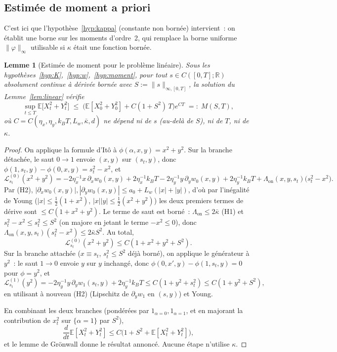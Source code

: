 \documentclass[11pt,a4paper]{article}
\newcommand{\ind}[1]{\mathrm{1}_{#1}}
\newcommand{\E}{\mathbb{E}}
\newcommand{\R}{\mathbb{R}}
\newcommand{\Lon}{\Lambda_{\mathrm{on}}}
\theoremstyle{plain}
\newtheorem{lem}[thm]{Lemme}
\theoremstyle{definition}
\begin{document}
\subsection{Estim\'ee de moment a priori}
\label{sec:moment}

C'est ici que l'hypoth\`ese~\ref{hyp:kappa} (constante non born\'ee) intervient~: on \'etablit une borne sur les moments d'ordre~2, qui remplace la borne uniforme $\|\varphi\|_\infty$ utilisable si $\kappa$ \'etait une fonction born\'ee.

\begin{lem}[Estim\'ee de moment pour le probl\`eme lin\'eaire]
\label{lem:moment}
Sous les hypoth\`eses~\ref{hyp:K},~\ref{hyp:w},~\ref{hyp:moment}, pour tout $s\in C([0,T];\R)$ absolument continue \`a d\'eriv\'ee born\'ee avec $S:=\|s\|_{\infty,[0,T]}$, la solution du Lemme~\ref{lem:linear} v\'erifie
\[
\sup_{t\le T}\E\big[X_t^2+Y_t^2\big] \;\le\; \big(\E[X_0^2+Y_0^2] + C(1+S^2)\,T\big)e^{CT} \;=:\; M(S,T),
\]
o\`u $C=C(\eta_x,\eta_y,k_BT,L_w,\bar\kappa,d)$ ne d\'epend ni de $s$ (au-del\`a de $S$), ni de $T$, ni de $\kappa$.
\end{lem}

\begin{proof}
On applique la formule d'It\^o \`a $\phi(\alpha,x,y)=x^2+y^2$. Sur la branche d\'etach\'ee, le saut $0\to1$ envoie $(x,y)$ sur $(s_t,y)$, donc $\phi(1,s_t,y)-\phi(0,x,y)=s_t^2-x^2$, et
\[
\mathcal L^{(0)}_{s_t}(x^2+y^2) = -2\eta_x^{-1}x\,\partial_xw_0(x,y)+2\eta_x^{-1}k_BT -2\eta_y^{-1}y\,\partial_yw_0(x,y)+2\eta_y^{-1}k_BT + \Lon(x,y,s_t)\big(s_t^2-x^2\big).
\]
Par (H2), $|\partial_xw_0(x,y)|,|\partial_yw_0(x,y)|\le a_0+L_w(|x|+|y|)$, d'o\`u par l'in\'egalit\'e de Young ($|x|\le\frac12(1+x^2)$, $|x||y|\le\frac12(x^2+y^2)$) les deux premiers termes de d\'erive sont $\le C(1+x^2+y^2)$. Le terme de saut est born\'e~: $\Lon\le2\bar\kappa$ (H1) et $s_t^2-x^2\le s_t^2\le S^2$ (on majore en jetant le terme $-x^2\le0$), donc $\Lon(x,y,s_t)(s_t^2-x^2)\le 2\bar\kappa S^2$. Au total,
\[
\mathcal L^{(0)}_{s_t}(x^2+y^2) \le C(1+x^2+y^2+S^2).
\]
Sur la branche attach\'ee ($x\equiv s_t$, $s_t^2\le S^2$ d\'ej\`a born\'e), on applique le g\'en\'erateur \`a $y^2$~: le saut $1\to0$ envoie $y$ sur $y$ inchang\'e, donc $\phi(0,x',y)-\phi(1,s_t,y)=0$ pour $\phi=y^2$, et
\[
\mathcal L^{(1)}_{s_t}(y^2) = -2\eta_y^{-1}y\,\partial_yw_1(s_t,y)+2\eta_y^{-1}k_BT \le C(1+y^2+s_t^2) \le C(1+y^2+S^2),
\]
en utilisant \`a nouveau (H2) (Lipschitz de $\partial_yw_1$ en $(s,y)$) et Young.

En combinant les deux branches (pond\'er\'ees par $\ind{\alpha=0},\ind{\alpha=1}$, et en majorant la contribution de $x_t^2$ sur $\{\alpha=1\}$ par $S^2$),
\[
\frac{d}{dt}\E[X_t^2+Y_t^2] \le C\big(1+S^2+\E[X_t^2+Y_t^2]\big),
\]
et le lemme de Gr\"onwall donne le r\'esultat annonc\'e. Aucune \'etape n'utilise $\kappa$.
\end{proof}
\end{document}
